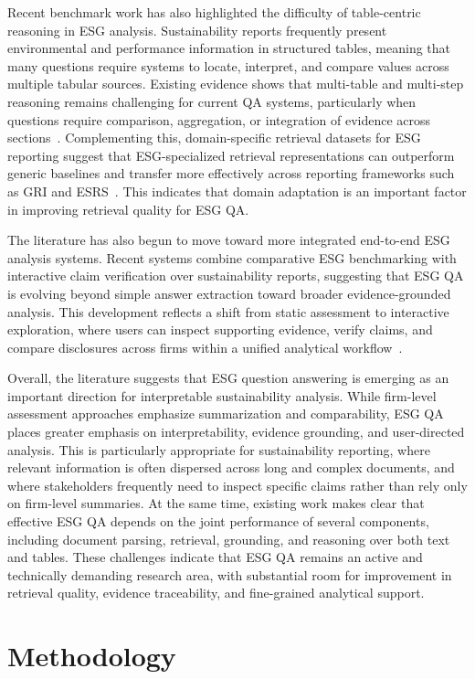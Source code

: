 \documentclass[sn-mathphys, oneside]{sn-jnl}
\begin{document}
Recent benchmark work has also highlighted the difficulty of table-centric reasoning in ESG analysis. Sustainability reports frequently present environmental and performance information in structured tables, meaning that many questions require systems to locate, interpret, and compare values across multiple tabular sources. Existing evidence shows that multi-table and multi-step reasoning remains challenging for current QA systems, particularly when questions require comparison, aggregation, or integration of evidence across sections~\cite{contalbo2025griqa}. Complementing this, domain-specific retrieval datasets for ESG reporting suggest that ESG-specialized retrieval representations can outperform generic baselines and transfer more effectively across reporting frameworks such as GRI and ESRS~\cite{ahmed2025esgcid}. This indicates that domain adaptation is an important factor in improving retrieval quality for ESG QA.

The literature has also begun to move toward more integrated end-to-end ESG analysis systems. Recent systems combine comparative ESG benchmarking with interactive claim verification over sustainability reports, suggesting that ESG QA is evolving beyond simple answer extraction toward broader evidence-grounded analysis. This development reflects a shift from static assessment to interactive exploration, where users can inspect supporting evidence, verify claims, and compare disclosures across firms within a unified analytical workflow~\cite{santacroce2026clariesg}.

Overall, the literature suggests that ESG question answering is emerging as an important direction for interpretable sustainability analysis. While firm-level assessment approaches emphasize summarization and comparability, ESG QA places greater emphasis on interpretability, evidence grounding, and user-directed analysis. This is particularly appropriate for sustainability reporting, where relevant information is often dispersed across long and complex documents, and where stakeholders frequently need to inspect specific claims rather than rely only on firm-level summaries. At the same time, existing work makes clear that effective ESG QA depends on the joint performance of several components, including document parsing, retrieval, grounding, and reasoning over both text and tables. These challenges indicate that ESG QA remains an active and technically demanding research area, with substantial room for improvement in retrieval quality, evidence traceability, and fine-grained analytical support.
\section{Methodology}
\end{document}
